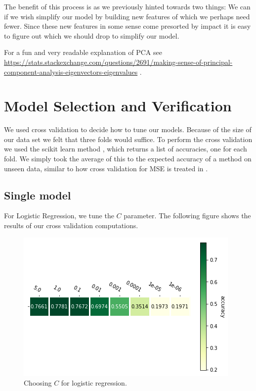 \documentclass[parskip=half]{scrartcl}
\theoremstyle{definition}
\theoremstyle{remark}
\newcommand{\funcname}[1]{{\color{blue}{\texttt{#1}}}}
\begin{document}
The benefit of this process is as we previously hinted towards two things: 
We can if we wish simplify our model by building new features of which we perhaps need fewer.
Since these new features in some sense come presorted by impact it is easy to figure out which we should drop to simplify our model. 

For a fun and very readable explanation of PCA see \url{https://stats.stackexchange.com/questions/2691/making-sense-of-principal-component-analysis-eigenvectors-eigenvalues} . 

\section{Model Selection and Verification}

We used cross validation to decide how to tune our models. 
Because of the size of our data set we felt that three folds would suffice.
To perform the cross validation we used the scikit learn method \funcname{cross\_val\_score}, which returns a list of accuracies, one for each fold. 
We simply took the average of this to the expected accuracy of a method on unseen data, similar to how cross validation for MSE is treated in \cite[Chapter 7.10]{htf:esl}.

\subsection{Single model}

For Logistic Regression, we tune the $C$ parameter. 
The following figure shows the results of our cross validation computations. 

\begin{figure}[H]
\caption{Choosing $C$ for logistic regression.}
\centering
\includegraphics[scale=0.6]{images/logistic_params.png}
\end{figure}
\end{document}
